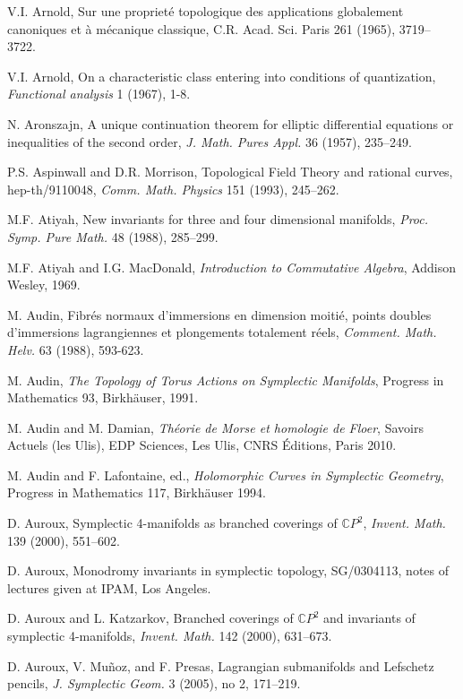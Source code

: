 V.I. Arnold, Sur une proprieté topologique des applications globalement canoniques et à mécanique classique, C.R. Acad. Sci. Paris 261 (1965), 3719–3722.

 V.I. Arnold, On a characteristic class entering into conditions of quantization, \emph{Functional analysis} 1 (1967), 1-8.

 N. Aronszajn, A unique continuation theorem for elliptic differential equations or inequalities of the second order, \emph{J. Math. Pures Appl.} 36 (1957), 235–249.

 P.S. Aspinwall and D.R. Morrison, Topological Field Theory and rational curves, hep-th/9110048, \emph{Comm. Math. Physics} 151 (1993), 245–262.

 M.F. Atiyah, New invariants for three and four dimensional manifolds, \emph{Proc. Symp. Pure Math.} 48 (1988), 285–299.

 M.F. Atiyah and I.G. MacDonald, \emph{Introduction to Commutative Algebra}, Addison Wesley, 1969.

 M. Audin, Fibrés normaux d’immersions en dimension moitié, points doubles d’immersions lagrangiennes et plongements totalement réels, \emph{Comment. Math. Helv.} 63 (1988), 593-623.

 M. Audin, \emph{The Topology of Torus Actions on Symplectic Manifolds}, Progress in Mathematics 93, Birkhäuser, 1991.

 M. Audin and M. Damian, \emph{Théorie de Morse et homologie de Floer}, Savoirs Actuels (les Ulis), EDP Sciences, Les Ulis, CNRS Éditions, Paris 2010.

 M. Audin and F. Lafontaine, ed., \emph{Holomorphic Curves in Symplectic Geometry}, Progress in Mathematics 117, Birkhäuser 1994.

 D. Auroux, Symplectic 4-manifolds as branched coverings of $\mathbb{C}P^{2}$, \emph{Invent. Math.} 139 (2000), 551–602.

 D. Auroux, Monodromy invariants in symplectic topology, SG/0304113, notes of lectures given at IPAM, Los Angeles.

 D. Auroux and L. Katzarkov, Branched coverings of $\mathbb{C}P^{2}$ and invariants of symplectic 4-manifolds, \emph{Invent. Math.} 142 (2000), 631–673.

 D. Auroux, V. Muñoz, and F. Presas, Lagrangian submanifolds and Lefschetz pencils, \emph{J. Symplectic Geom.} 3 (2005), no 2, 171–219.

